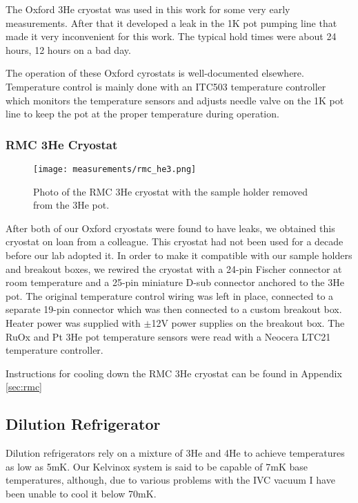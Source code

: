 The Oxford 3He cryostat was used in this work for some very early measurements. After that it developed a leak in the 1K pot pumping line that made it very inconvenient for this work. The typical hold times were about 24 hours, 12 hours on a bad day.

The operation of these Oxford cyrostats is well-documented elsewhere. Temperature control is mainly done with an ITC503 temperature controller which monitors the temperature sensors and adjusts needle valve on the 1K pot line to keep the pot at the proper temperature during operation.

\subsubsection*{RMC 3He Cryostat}

\begin{figure}
    \centering
    \texttt{[image: measurements/rmc\_he3.png]}
    \caption{Photo of the RMC 3He cryostat with the sample holder removed from the 3He pot.}
    \label{fig:rmc}
\end{figure}

After both of our Oxford cryostats were found to have leaks, we obtained this cryostat on loan from a colleague. This cryostat had not been used for a decade before our lab adopted it. In order to make it compatible with our sample holders and breakout boxes, we rewired the cryostat with a 24-pin Fischer connector at room temperature and a 25-pin miniature D-sub connector anchored to the 3He pot. The original temperature control wiring was left in place, connected to a separate 19-pin connector which was then connected to a custom breakout box. Heater power was supplied with $\pm$12V power supplies on the breakout box. The RuOx and Pt 3He pot temperature sensors were read with a Neocera LTC21 temperature controller.

Instructions for cooling down the RMC 3He cryostat can be found in Appendix \ref{sec:rmc}

\subsection{Dilution Refrigerator}

Dilution refrigerators rely on a mixture of 3He and 4He to achieve temperatures as low as 5mK. Our Kelvinox system is said to be capable of 7mK base temperatures, although, due to various problems with the IVC vacuum I have been unable to cool it below 70mK.

